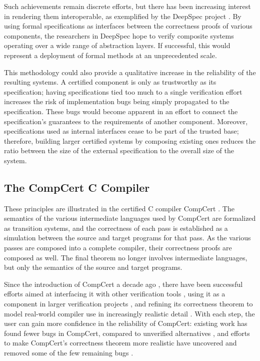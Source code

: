 \documentclass[sigplan,10pt,review,anonymous]{acmart}
\begin{document}
Such achievements remain discrete efforts, but
there has been increasing interest in rendering them interoperable,
as exemplified by the DeepSpec project \cite{deepspec}.
By using formal specifications as interfaces
between the correctness proofs of various components, %
the researchers in DeepSpec hope to
verify composite systems
operating over a wide range of abstraction layers.
If successful,
this would represent a deployment of formal methods
at an unprecedented scale.

This methodology could also provide a qualitative increase
in the reliability of the resulting systems.
A certified component is only as trustworthy as its specification;
having specifications tied too much to a single verification effort
increases the risk of
implementation bugs being simply propagated to
the specification.
These bugs would become apparent in an effort to
connect the specification's guarantees to
the requirements of another component.
Moreover,
specifications used as internal interfaces
cease to be part of
the trusted base;
therefore,
building larger certified systems
by composing existing ones
reduces the
ratio between the size of the external specification to
the overall size of the system.


\subsection{The CompCert C Compiler} %

These principles are illustrated in
the certified C compiler CompCert \cite{compcert}.
The semantics of the various intermediate languages
used by CompCert are formalized as transition systems,
and the correctness of each pass is established
as a simulation between
the source and target programs for that pass.
As the various passes are composed into a complete compiler,
their correctness proofs are composed as well.
The final theorem no longer involves
intermediate languages,
but only the semantics of the source and target programs.

Since the introduction of CompCert a decade ago \cite{compcert},
there have been successful efforts aimed at
interfacing it with other verification tools \cite{vst},
using it as a component in larger verification projects \cite{popl15},
and refining its correctness theorem
to model real-world compiler use
in increasingly realistic detail
\cite{qompcert,sepcompcert,compcompcert,compcerttso,compcertshm,compcertm}.
With each step,
the user can gain more confidence in the reliability of CompCert:
existing work %
has found fewer bugs in CompCert,
compared to unverified alternatives \cite{csmith},
and efforts to make CompCert's correctness theorem more realistic
have uncovered and removed some of the few remaining bugs \cite{sepcompcert}.
\end{document}
